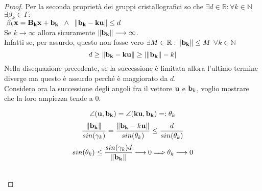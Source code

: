 \documentclass[10pt,a4paper]{book}
\begin{document}
\begin{proof}
Per la seconda proprietà dei gruppi cristallografici so che $ \exists d \in \mathbb{R} : \forall k \in \mathbb{N} $ $  \exists \beta_k \in \Gamma : $ \\
$ \; \beta_k \vb{x} = \vb{B_k x + b_k}  \; \; \land \; \;\norm{\vb{b_k - ku }} \leq d $ 
\\
Se $k \longrightarrow \infty$ allora sicuramente $ \norm{\vb{b_k}} \longrightarrow \infty$.  \\
Infatti se, per assurdo, questo non fosse vero $\exists M \in \mathbb{R} : \norm{\vb{b_k}} \leq M $   $  \forall k \in \mathbb{N} $
\[ d \geq \norm{\vb{b_k - ku}} \geq | \norm{\vb{b_k}} - k | \]
Nella disequazione  precedente, se la successione è limitata allora l'ultimo termine diverge ma questo è assurdo perché è maggiorato da $d$. \\



Considero ora la successione degli angoli fra il vettore $\vb{u}$ e $\vb{b}_k$, voglio mostrare che la loro ampiezza tende a 0. 
\begin{minipage}{0.5\textwidth}
\end{minipage}\hfill
\begin{minipage}{0.5\textwidth}
	\[ \angle (\vb{u , b_k}) = \angle (\vb{ku, b_k}) = : \theta_k \]
\[ \frac{\norm{\vb{b_k}}}{sin(\gamma_k)} = \frac{\norm{\vb{b_k} - k\vb{u}}}{sin(\theta_k)}  \leq \frac{d}{sin(\theta_k)} \]
\[  sin(\theta_k) \leq \frac{sin(\gamma_k)d}{\norm{\vb{b_k}}} \longrightarrow 0 \Longrightarrow \theta_k \longrightarrow 0 \]
\end{minipage}\\



\end{proof}
\end{document}

